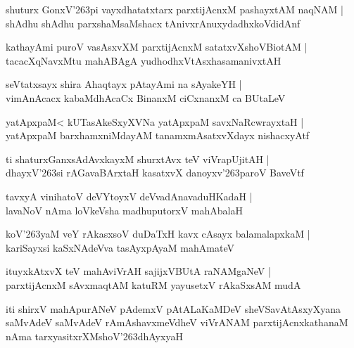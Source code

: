 \documentclass[twoside,12pt,openright]{book}
\def\S{\char'263}
\newcounter{shloka}[chapter]
\begin{document}
\begin{shloka}%
shuturx GonxV\S pi vayxdhatatxtarx parxtijAcnxM pashayxtAM naqNAM |\\
shAdhu shAdhu parxshaMsaMshacx tAnivxrAnuxydadhxkoVdidAnf 
\end{shloka}

\begin{shloka}%
kathayAmi puroV vasAsxvXM parxtijAcnxM satatxvXshoVBiotAM |\\
tacacXqNavxMtu mahABAgA yudhodhxVtAsxhasamanivxtAH 
\end{shloka}

\begin{shloka}%
seVtatxsayx shira Ahaqtayx pAtayAmi na sAyakeYH |\\
vimAnAcacx kabaMdhAcaCx BinanxM ciCxnanxM ca BUtaLeV 
\end{shloka}

\begin{shloka}%
yatApxpaM< kUTasAkeSxyXVNa yatApxpaM savxNaRcwrayxtaH |\\
yatApxpaM barxhamxniMdayAM tanamxmAsatxvXdayx nishacxyAtf 
\end{shloka}

\begin{shloka}%
ti  shaturxGanxsAdAvxkayxM shurxtAvx teV viVrapUjitAH |\\
dhayxV\S si rAGavaBArxtaH kasatxvX danoyxv\S paroV BaveVtf 
\end{shloka}

\begin{shloka}%
tavxyA vinihatoV deVYtoyxV deVvadAnavaduHKadaH |\\
lavaNoV nAma loVkeVsha madhuputorxV mahAbalaH 
\end{shloka}

\begin{shloka}%
koV\S yaM veY rAkasxsoV duDaTxH kavx cAsayx balamalapxkaM |\\
kariSayxsi kaSxNAdeVva tasAyxpAyaM mahAmateV 
\end{shloka}

\begin{shloka}%
ituyxkAtxvX teV mahAviVrAH sajijxVBUtA raNAMgaNeV |\\
parxtijAcnxM sAvxmaqtAM katuRM yayusetxV rAkaSxsAM mudA
\end{shloka}


\begin{center}
iti shirxV mahApurANeV pAdemxV pAtALaKaMDeV sheVSavAtAsxyXyana saMvAdeV 
saMvAdeV rAmAshavxmeVdheV viVrANAM parxtijAcnxkathanaM nAma tarxyasitxrXMshoV\S dhAyxyaH
\end{center}
\end{document}
